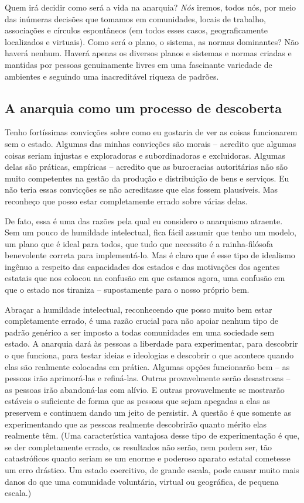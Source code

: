 Quem irá decidir como será a vida na anarquia? \emph{Nós} iremos, todos nós, por meio das inúmeras decisões que tomamos em comunidades, locais de trabalho, associações e círculos espontâneos (em todos esses casos, geograficamente localizados e virtuais). Como será o plano, o sistema, as normas dominantes? Não haverá nenhum. Haverá apenas os diversos planos e sistemas e normas criadas e mantidas por pessoas genuinamente livres em uma fascinante variedade de ambientes e seguindo uma inacreditável riqueza de padrões.

\subsection*{A anarquia como um processo de descoberta}

Tenho fortíssimas convicções sobre como eu gostaria de ver as coisas funcionarem sem o estado. Algumas das minhas convicções são morais -- acredito que algumas coisas seriam injustas e exploradoras e subordinadoras e excluidoras. Algumas delas são práticas, empíricas -- acredito que as burocracias autoritárias não são muito competentes na gestão da produção e distribuição de bens e serviços. Eu não teria essas convicções se não acreditasse que elas fossem plausíveis. Mas reconheço que posso estar completamente errado sobre várias delas.

De fato, essa é uma das razões pela qual eu considero o anarquismo atraente. Sem um pouco de humildade intelectual, fica fácil assumir que tenho um modelo, um plano que é ideal para todos, que tudo que necessito é a rainha-filósofa benevolente correta para implementá-lo. Mas é claro que é esse tipo de idealismo ingênuo a respeito das capacidades dos estados e das motivações dos agentes estatais que nos colocou na confusão em que estamos agora, uma confusão em que o estado nos tiraniza -- supostamente para o nosso próprio bem.

Abraçar a humildade intelectual, reconhecendo que posso muito bem estar completamente errado, é uma razão crucial para não apoiar nenhum tipo de padrão genérico a ser imposto a todas comunidades em uma sociedade sem estado. A anarquia dará às pessoas a liberdade para experimentar, para descobrir o que funciona, para testar ideias e ideologias e descobrir o que acontece quando elas são realmente colocadas em prática. Algumas opções funcionarão bem -- as pessoas irão aprimorá-las e refiná-las. Outras provavelmente serão desastrosas -- as pessoas irão abandoná-las com alívio. E outras provavelmente se mostrarão estáveis o suficiente de forma que as pessoas que sejam apegadas a elas as preservem e continuem dando um jeito de persistir. A questão é que somente as experimentando que as pessoas realmente descobrirão quanto mérito elas realmente têm. (Uma característica vantajosa desse tipo de experimentação é que, se der completamente errado, os resultados não serão, nem podem ser, tão catastróficos quanto seriam se um enorme e poderoso aparato estatal cometesse um erro drástico. Um estado coercitivo, de grande escala, pode causar muito mais danos do que uma comunidade voluntária, virtual ou geográfica, de pequena escala.)

